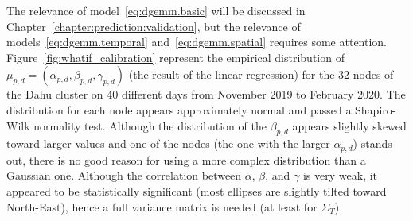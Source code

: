             The relevance of model~\eqref{eq:dgemm.basic} will be discussed in
            Chapter~\ref{chapter:prediction:validation}, but the relevance of models~\eqref{eq:dgemm.temporal}
            and~\eqref{eq:dgemm.spatial} requires some attention.
            Figure~\ref{fig:whatif_calibration} represent the empirical distribution of \(\mu_{p,d} =
            (\alpha_{p,d},\beta_{p,d},\gamma_{p,d})\) (the result of the linear regression) for the 32 nodes of the Dahu
            cluster on 40 different days from November 2019 to February 2020. The distribution for each node appears
            approximately normal and passed a Shapiro-Wilk normality test. Although the distribution of the
            \(\beta_{p,d}\) appears slightly skewed toward larger values and one of the nodes (the one with the larger
            \(\alpha_{p,d}\)) stands out, there is no good reason for using a more complex distribution than a Gaussian
            one. Although the correlation between \(\alpha\), \(\beta\), and \(\gamma\) is very weak, it appeared to be
            statistically significant (most ellipses are slightly tilted toward North-East), hence a full variance
            matrix is needed (at least for \(\Sigma_T\)).

